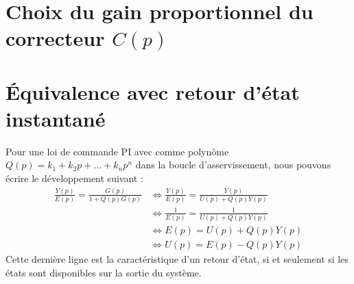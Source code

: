 \section{Choix du gain proportionnel du correcteur $C(p)$}
 
\section{Équivalence avec retour d'état instantané}
Pour une loi de commande PI avec comme polynôme $Q(p) = k_1+k_2p+...+k_np^n$ dans la boucle d'asservissement, nous pouvons écrire le développement suivant : 
\begin{align*}
\frac{Y(p)}{E(p)} = \frac{G(p)}{1 + Q(p)G(p)} & \Leftrightarrow \frac{Y(p)}{E(p)} = \frac{Y(p)}{U(p) + Q(p)Y(p)}\\
&\Leftrightarrow \frac{1}{E(p)} = \frac{1}{U(p) + Q(p)Y(p)} \\
& \Leftrightarrow E(p) = U(p) + Q(p)Y(p)\\
& \Leftrightarrow U(p) = E(p) - Q(p)Y(p)
\end{align*} 
Cette dernière ligne est la caractéristique d'un retour d'état, si et seulement si les états sont disponibles sur la sortie du système.